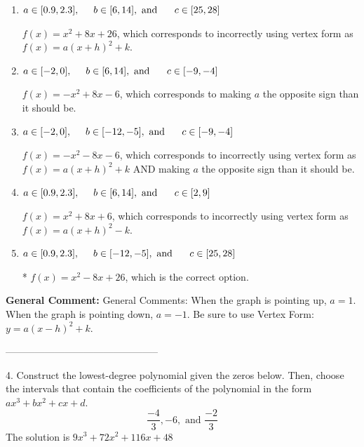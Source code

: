 \documentclass{extbook}[14pt]
\begin{document}
\begin{enumerate}[label=\Alph*.] 
\item $ a \in [0.9, 2.3], \hspace*{5mm} b \in [6, 14], \text{ and } \hspace*{5mm} c \in [25, 28] $ 

 $f(x)=x^{2} +8 x + 26$, which corresponds to incorrectly using vertex form as $f(x) = a(x+h)^2+k$. 
\item $ a \in [-2, 0], \hspace*{5mm} b \in [6, 14], \text{ and } \hspace*{5mm} c \in [-9, -4] $ 

 $f(x)=-x^{2} +8 x -6$, which corresponds to making $a$ the opposite sign than it should be. 
\item $ a \in [-2, 0], \hspace*{5mm} b \in [-12, -5], \text{ and } \hspace*{5mm} c \in [-9, -4] $ 

 $f(x)=-x^{2} -8 x -6$, which corresponds to incorrectly using vertex form as $f(x) = a(x+h)^2+k$ AND making $a$ the opposite sign than it should be. 
\item $ a \in [0.9, 2.3], \hspace*{5mm} b \in [6, 14], \text{ and } \hspace*{5mm} c \in [2, 9] $ 

 $f(x)=x^{2} +8 x + 6$, which corresponds to incorrectly using vertex form as $f(x) = a(x+h)^2 - k$. 
\item $ a \in [0.9, 2.3], \hspace*{5mm} b \in [-12, -5], \text{ and } \hspace*{5mm} c \in [25, 28] $ 

 * $f(x)=x^{2} -8 x + 26$, which is the correct option. 
\end{enumerate} 
 
\textbf{General Comment:} General Comments: When the graph is pointing up, $a=1$. When the graph is pointing down, $a=-1$. Be sure to use Vertex Form: $y = a(x-h)^2+k$. 

-----------------------------------------------

4. Construct the lowest-degree polynomial given the zeros below. Then, choose the intervals that contain the coefficients of the polynomial in the form $ax^3+bx^2+cx+d$.
\[ \frac{-4}{3}, -6, \text{ and } \frac{-2}{3} \] 
The solution is $ 9x^{3} +72 x^{2} +116 x + 48 $ 
\end{document}

